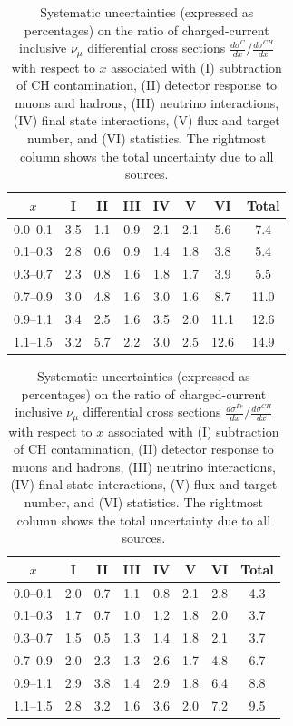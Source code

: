 \documentclass[aps,preprint,showpacs,superscriptaddress]{revtex4} %
\newcommand{\numu}{\ensuremath{\nu_{\mu}}\xspace}
\newcommand{\Xbj}{\ensuremath{x}\xspace}
\begin{document}
\begingroup
\squeezetable
\begin{table}
  \begin{tabular}{cccccccc}
    \hline \hline
    \Xbj & I & II & III & IV & V & VI & Total \\ 
    \hline
    0.0--0.1 & 3.5 & 1.1 & 0.9 & 2.1 & 2.1 & 5.6 & 7.4 \\ 
    0.1--0.3 & 2.8 & 0.6 & 0.9 & 1.4 & 1.8 & 3.8 & 5.4 \\ 
    0.3--0.7 & 2.3 & 0.8 & 1.6 & 1.8 & 1.7 & 3.9 & 5.5 \\ 
    0.7--0.9 & 3.0 & 4.8 & 1.6 & 3.0 & 1.6 & 8.7 & 11.0 \\ 
    0.9--1.1 & 3.4 & 2.5 & 1.6 & 3.5 & 2.0 & 11.1 & 12.6 \\ 
    1.1--1.5 & 3.2 & 5.7 & 2.2 & 3.0 & 2.5 & 12.6 & 14.9 \\ 
    \hline \hline
  \end{tabular}
  \caption{Systematic uncertainties (expressed as percentages) on the ratio of charged-current inclusive \numu differential cross sections $\frac{d\sigma^{C}}{d\Xbj}/\frac{d\sigma^{CH}}{d\Xbj}$ with respect to \Xbj associated with  (I) subtraction of CH contamination, (II) detector response to muons and hadrons, (III) neutrino interactions, (IV) final state interactions, (V) flux and target number, and (VI) statistics.  The rightmost column shows the total uncertainty due to all sources.}
  \label{tab:x_ratio_06_91_sys_errors}
\end{table}
\endgroup

\begingroup
\squeezetable
\begin{table}
  \begin{tabular}{cccccccc}
    \hline \hline
    \Xbj & I & II & III & IV & V & VI & Total \\ 
    \hline
    0.0--0.1 & 2.0 & 0.7 & 1.1 & 0.8 & 2.1 & 2.8 & 4.3 \\ 
    0.1--0.3 & 1.7 & 0.7 & 1.0 & 1.2 & 1.8 & 2.0 & 3.7 \\ 
    0.3--0.7 & 1.5 & 0.5 & 1.3 & 1.4 & 1.8 & 2.1 & 3.7 \\ 
    0.7--0.9 & 2.0 & 2.3 & 1.3 & 2.6 & 1.7 & 4.8 & 6.7 \\ 
    0.9--1.1 & 2.9 & 3.8 & 1.4 & 2.9 & 1.8 & 6.4 & 8.8 \\ 
    1.1--1.5 & 2.8 & 3.2 & 1.6 & 3.6 & 2.0 & 7.2 & 9.5 \\ 
    \hline \hline
  \end{tabular}
  \caption{Systematic uncertainties (expressed as percentages) on the ratio of charged-current inclusive \numu differential cross sections $\frac{d\sigma^{Fe}}{d\Xbj}/\frac{d\sigma^{CH}}{d\Xbj}$ with respect to \Xbj associated with  (I) subtraction of CH contamination, (II) detector response to muons and hadrons, (III) neutrino interactions, (IV) final state interactions, (V) flux and target number, and (VI) statistics.  The rightmost column shows the total uncertainty due to all sources.}
  \label{tab:x_ratio_26_92_sys_errors}
\end{table}
\endgroup
\end{document}
